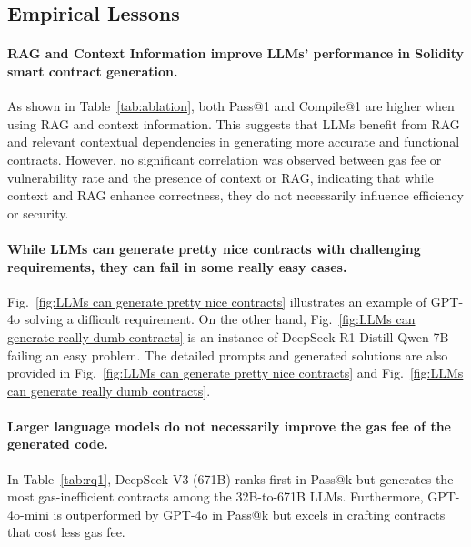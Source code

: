 \subsection{Empirical Lessons}
\label{sec:Findings}


\paragraph{RAG and Context Information improve LLMs' performance in Solidity smart contract generation.}
As shown in Table~\ref{tab:ablation}, both Pass@1 and Compile@1 are higher when using RAG and context information.
This suggests that LLMs benefit from RAG and relevant contextual dependencies in generating more accurate and functional contracts. 
However, no significant correlation was observed between gas fee or vulnerability rate and the presence of context or RAG, indicating that while context and RAG enhance correctness, they do not necessarily influence efficiency or security.


\paragraph{While LLMs can generate pretty nice contracts with challenging requirements, they can fail in some really easy cases.} 
Fig.~\ref{fig:LLMs can generate pretty nice contracts} illustrates an example of GPT-4o solving a difficult requirement. 
On the other hand, Fig.~\ref{fig:LLMs can generate really dumb contracts} is an instance of DeepSeek-R1-Distill-Qwen-7B failing an easy problem. 
The detailed prompts and generated solutions are also provided in Fig.~\ref{fig:LLMs can generate pretty nice contracts} and Fig.~\ref{fig:LLMs can generate really dumb contracts}.


\paragraph{Larger language models do not necessarily improve the gas fee of the generated code.} 
In Table~\ref{tab:rq1}, DeepSeek-V3 (671B) ranks first in Pass@k but generates the most gas-inefficient contracts among the 32B-to-671B LLMs. 
Furthermore, GPT-4o-mini is outperformed by GPT-4o in Pass@k but excels in crafting contracts that cost less gas fee.